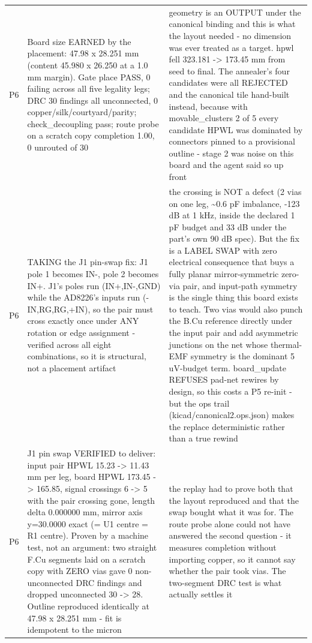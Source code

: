 \documentclass[11pt,a4paper]{article}
\begin{document}
{\begin{longtable}{lp{5.2cm}p{7.2cm}}
P6 & Board size EARNED by the placement: 47.98 x 28.251 mm (content 45.980 x 26.250 at a 1.0 mm margin). Gate place PASS, 0 failing across all five legality legs; DRC 30 findings all unconnected, 0 copper/silk/courtyard/parity; check\_decoupling pass; route probe on a scratch copy completion 1.00, 0 unrouted of 30 & geometry is an OUTPUT under the canonical binding and this is what the layout needed - no dimension was ever treated as a target. hpwl fell 323.181 -\textgreater{} 173.45 mm from seed to final. The annealer's four candidates were all REJECTED and the canonical tile hand-built instead, because with movable\_clusters 2 of 5 every candidate HPWL was dominated by connectors pinned to a provisional outline - stage 2 was noise on this board and the agent said so up front \\
P6 & TAKING the J1 pin-swap fix: J1 pole 1 becomes IN-, pole 2 becomes IN+. J1's poles run (IN+,IN-,GND) while the AD8226's inputs run (-IN,RG,RG,+IN), so the pair must cross exactly once under ANY rotation or edge assignment - verified across all eight combinations, so it is structural, not a placement artifact & the crossing is NOT a defect (2 vias on one leg, \textasciitilde{}0.6 pF imbalance, -123 dB at 1 kHz, inside the declared 1 pF budget and 33 dB under the part's own 90 dB spec). But the fix is a LABEL SWAP with zero electrical consequence that buys a fully planar mirror-symmetric zero-via pair, and input-path symmetry is the single thing this board exists to teach. Two vias would also punch the B.Cu reference directly under the input pair and add asymmetric junctions on the net whose thermal-EMF symmetry is the dominant 5 uV-budget term. board\_update REFUSES pad-net rewires by design, so this costs a P5 re-init - but the ops trail (kicad/canonical2.ops.json) makes the replace deterministic rather than a true rewind \\
P6 & J1 pin swap VERIFIED to deliver: input pair HPWL 15.23 -\textgreater{} 11.43 mm per leg, board HPWL 173.45 -\textgreater{} 165.85, signal crossings 6 -\textgreater{} 5 with the pair crossing gone, length delta 0.000000 mm, mirror axis y=30.0000 exact (= U1 centre = R1 centre). Proven by a machine test, not an argument: two straight F.Cu segments laid on a scratch copy with ZERO vias gave 0 non-unconnected DRC findings and dropped unconnected 30 -\textgreater{} 28. Outline reproduced identically at 47.98 x 28.251 mm - fit is idempotent to the micron & the replay had to prove both that the layout reproduced and that the swap bought what it was for. The route probe alone could not have answered the second question - it measures completion without importing copper, so it cannot say whether the pair took vias. The two-segment DRC test is what actually settles it \\

\end{longtable}}
\end{document}
